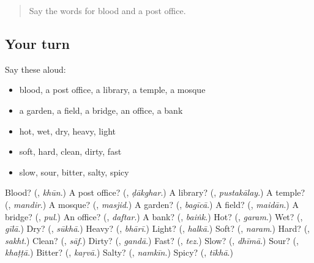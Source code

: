 \label{lesson:HI-R156-second-pass-the-body-and-places}



\begin{quote}
Say the words for blood and a post office.
\end{quote}

\subsection*{Your turn}
Say these aloud:

\begin{itemize}
\raggedright
  \item blood, a post office, a library, a temple, a mosque
  \item a garden, a field, a bridge, an office, a bank
  \item hot, wet, dry, heavy, light
  \item soft, hard, clean, dirty, fast
  \item slow, sour, bitter, salty, spicy
\end{itemize}

\begin{tcolorbox}[breakable,colback=teal!4,colframe=teal!35!black,title={Before you move on}]
Blood? (\textbf{}, \emph{khūn}.) A post office? (\textbf{}, \emph{ḍākghar}.) A library? (\textbf{}, \emph{pustakālay}.) A temple? (\textbf{}, \emph{mandir}.) A mosque? (\textbf{}, \emph{masjid}.) A garden? (\textbf{}, \emph{bagīcā}.) A field? (\textbf{}, \emph{maidān}.) A bridge? (\textbf{}, \emph{pul}.) An office? (\textbf{}, \emph{daftar}.) A bank? (\textbf{}, \emph{baiṅk}.) Hot? (\textbf{}, \emph{garam}.) Wet? (\textbf{}, \emph{gīlā}.) Dry? (\textbf{}, \emph{sūkhā}.) Heavy? (\textbf{}, \emph{bhārī}.) Light? (\textbf{}, \emph{halkā}.) Soft? (\textbf{}, \emph{naram}.) Hard? (\textbf{}, \emph{sakht}.) Clean? (\textbf{}, \emph{sāf}.) Dirty? (\textbf{}, \emph{gandā}.) Fast? (\textbf{}, \emph{tez}.) Slow? (\textbf{}, \emph{dhīmā}.) Sour? (\textbf{}, \emph{khaṭṭā}.) Bitter? (\textbf{}, \emph{kaṛvā}.) Salty? (\textbf{}, \emph{namkīn}.) Spicy? (\textbf{}, \emph{tīkhā}.)
\end{tcolorbox}
